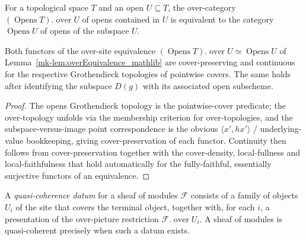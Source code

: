 \begin{lemma}
  \label{mk-lem:overEquivalence_mathlib}
  \mathlibok

  For a topological space \(T\) and an open \(U \subseteq T\), the over-category
  \((\operatorname{Opens} T).\operatorname{over} U\) of opens contained in \(U\) is equivalent to the
  category \(\operatorname{Opens} U\) of opens of the subspace \(U\).
\end{lemma}

\begin{lemma}
  \label{mk-lem:overEquivalence_isContinuous}

  Both functors of the over-site equivalence
  \((\operatorname{Opens} T).\operatorname{over} U \simeq \operatorname{Opens} U\) of
  Lemma~\ref{mk-lem:overEquivalence_mathlib} are cover-preserving and continuous for the respective
  Grothendieck topologies of pointwise covers. The same holds after identifying the
  subspace \(D(g)\) with its associated open subscheme.
\end{lemma}
\begin{proof}
  The opens Grothendieck topology is the pointwise-cover predicate; the over-topology unfolds via
  the membership criterion for over-topologies, and the subspace-versus-image point correspondence is
  the obvious \(\langle x', hx'\rangle\) / underlying-value bookkeeping, giving cover-preservation of
  each functor. Continuity then follows from cover-preservation together with the cover-density,
  local-fullness and local-faithfulness that hold automatically for the fully-faithful, essentially
  surjective functors of an equivalence.
\end{proof}

\begin{lemma}
  \label{mk-lem:quasicoherentData_mathlib}
  \mathlibok

  A \emph{quasi-coherence datum} for a sheaf of modules \(\mathcal{F}\) consists of a family of objects
  \(U_i\) of the site that covers the terminal object, together with, for each \(i\), a presentation of
  the over-picture restriction \(\mathcal{F}.\operatorname{over} U_i\). A sheaf of modules is
  quasi-coherent precisely when such a datum exists.
\end{lemma}

